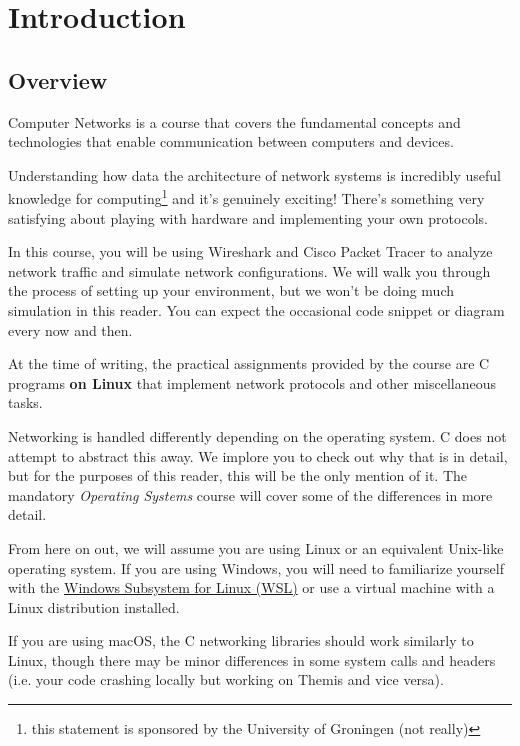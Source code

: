 \chapter{Introduction}
\section{Overview}
Computer Networks is a course that covers the fundamental concepts and technologies that enable communication between computers and devices. 

Understanding how data the architecture of network systems is incredibly useful knowledge for computing\footnote{this statement is sponsored by the University of Groningen ({\tiny not really})} and it's genuinely exciting! There's something very satisfying about playing with hardware and implementing your own protocols.

In this course, you will be using Wireshark and Cisco Packet Tracer to analyze network traffic and simulate network configurations. We will walk you through the process of setting up your environment, but we won't be doing much simulation in this reader. You can expect the occasional code snippet or diagram every now and then.

At the time of writing, the practical assignments provided by the course are C programs \textbf{on Linux} that implement network protocols and other miscellaneous tasks.

\begin{importantblock}
Networking is handled differently depending on the operating system. C does not attempt to abstract this away. We implore you to check out why that is in detail, but for the purposes of this reader, this will be the only mention of it. The mandatory \textit{Operating Systems} course will cover some of the differences in more detail.

\vspace{1em}
From here on out, we will assume you are using Linux or an equivalent Unix-like operating system. If you are using Windows, you will need to familiarize yourself with the \href{https://docs.microsoft.com/en-us/windows/wsl/install}{Windows Subsystem for Linux (WSL)} or use a virtual machine with a Linux distribution installed.

\vspace{1em}
If you are using macOS, the C networking libraries should work similarly to Linux, though there may be minor differences in some system calls and headers (i.e. your code crashing locally but working on Themis and vice versa).
\end{importantblock}

